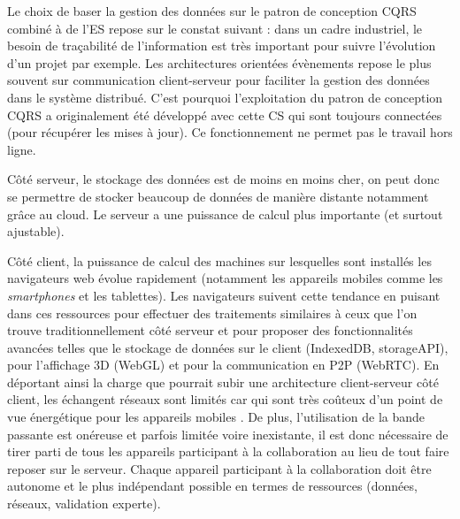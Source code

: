 %

Le choix de baser la gestion des données sur le patron de conception \gls{CQRS} 
combiné à de l'\gls{ES} repose sur le constat suivant : dans un cadre industriel, le 
besoin de traçabilité de l'information est très important pour suivre l'évolution d'un 
projet par exemple. 
Les architectures orientées évènements repose le plus souvent sur 
communication client-serveur pour faciliter la gestion des données dans le 
système distribué. C'est pourquoi l'exploitation du patron de conception 
\gls{CQRS} a originalement été développé avec cette  \gls{CS} qui sont 
toujours connectées (pour récupérer les mises à jour). 
Ce fonctionnement ne permet pas le travail hors ligne.

Côté serveur, le stockage des données est de moins en moins cher, on peut donc 
se permettre de stocker beaucoup de données de manière distante notamment 
grâce au \gls{cloud}. Le serveur a une puissance de calcul 
plus importante (et surtout ajustable).

Côté client, la puissance de calcul des machines sur lesquelles sont installés les 
navigateurs web évolue rapidement (notamment les appareils mobiles comme les 
\textit{smartphones} et les tablettes). Les navigateurs suivent cette tendance en 
puisant dans ces ressources pour effectuer des traitements similaires à ceux que 
l'on trouve traditionnellement côté serveur et pour proposer des fonctionnalités 
avancées telles que le stockage de données sur le client (IndexedDB, 
storageAPI), pour l'affichage 3D (WebGL) et pour la communication en \gls{P2P} 
(\gls{WebRTC}). En déportant ainsi la charge que pourrait subir une architecture 
client-serveur côté client, les échangent réseaux sont limités car qui 
sont très coûteux d'un point de vue énergétique pour les appareils mobiles 
\cite{Koskela2015}. De plus, l'utilisation de la bande passante est onéreuse et 
parfois limitée voire inexistante, il est donc nécessaire de tirer parti de tous les 
appareils participant à la collaboration au lieu de tout faire reposer sur le serveur. 
Chaque appareil participant à la collaboration doit être autonome et le plus 
indépendant possible en termes de ressources (données, réseaux, validation 
experte). 

